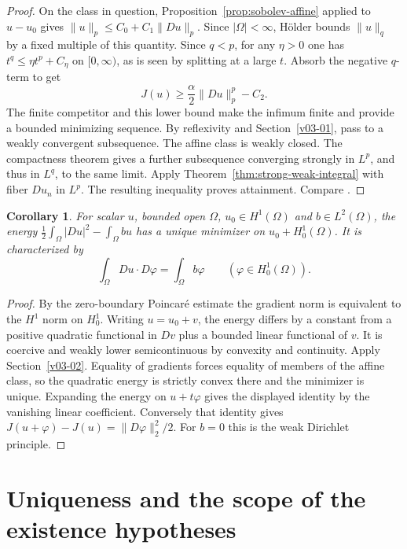 \documentclass[11pt,oneside,openany]{book}
\newcommand{\norm}[1]{\lVert #1\rVert}
\theoremstyle{plain}
\newtheorem{corollary}[theorem]{Corollary}
\theoremstyle{definition}
\theoremstyle{remark}
\begin{document}
\begin{proof}
On the class in question, Proposition~\ref{prop:sobolev-affine}
applied to \(u-u_0\) gives
\(\norm{u}_p\le C_0+C_1\norm{Du}_p\). Since \(|\Omega|<\infty\),
H\"older bounds \(\norm{u}_q\) by a fixed multiple of this
quantity. Since \(q<p\), for any \(\eta>0\) one has
\(t^q\le\eta t^p+C_\eta\) on \([0,\infty)\), as is seen by
splitting at a large \(t\). Absorb the negative \(q\)-term to get
\[
 J(u)\ge \frac{\alpha}{2}\norm{Du}_p^p-C_2 .
\]
The finite competitor and this lower bound make the infimum
finite and provide a bounded minimizing sequence. By reflexivity
and Section~\ref{v03-01}, pass to a weakly convergent subsequence.
The affine class is weakly closed. The compactness theorem gives
a further subsequence converging strongly in \(L^p\), and thus
in \(L^q\), to the same limit. Apply
Theorem~\ref{thm:strong-weak-integral} with fiber \(Du_n\) in
\(L^p\). The resulting inequality proves attainment. Compare
\cite[Theorems 3.1 and 3.3, and Exercise 3.3.4]{Dacorogna}.
\end{proof}

\begin{corollary}\label{cor:dirichlet-model}
For scalar \(u\), bounded open \(\Omega\), \(u_0\in H^1(\Omega)\)
and \(b\in L^2(\Omega)\), the energy
\(\tfrac12\int_\Omega |Du|^2-\int_\Omega bu\) has a unique
minimizer on \(u_0+H^1_0(\Omega)\). It is characterized by
\[
 \int_\Omega Du\cdot D\varphi=\int_\Omega b\varphi
 \qquad(\varphi\in H^1_0(\Omega)).
\]
\end{corollary}

\begin{proof}
By the zero-boundary Poincar\'e estimate the gradient norm is
equivalent to the \(H^1\) norm on \(H^1_0\). Writing \(u=u_0+v\),
the energy differs by a constant from a positive quadratic
functional in \(Dv\) plus a bounded linear functional of \(v\).
It is coercive and weakly lower semicontinuous by convexity and
continuity. Apply Section~\ref{v03-02}. Equality of gradients
forces equality of members of the affine class, so the quadratic
energy is strictly convex there and the minimizer is unique.
Expanding the energy on \(u+t\varphi\) gives the displayed
identity by the vanishing linear coefficient. Conversely that
identity gives \(J(u+\varphi)-J(u)=\norm{D\varphi}_2^2/2\).
For \(b=0\) this is the weak Dirichlet principle.
\end{proof}

\section{Uniqueness and the scope of the existence hypotheses}
\label{v08-04}
\end{document}
